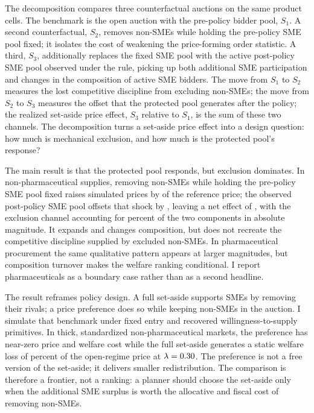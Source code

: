 The decomposition compares three counterfactual auctions on the same
product cells. The benchmark is the open auction with the pre-policy bidder
pool, $S_1$. A second counterfactual, $S_2$, removes non-SMEs while
holding the pre-policy SME pool fixed; it isolates the cost of weakening
the price-forming order statistic. A third, $S_3$, additionally replaces
the fixed SME pool with the active post-policy SME pool observed under
the rule, picking up both additional SME participation and changes in
the composition of active SME bidders. The move from $S_1$ to $S_2$
measures the lost competitive discipline from excluding non-SMEs; the
move from $S_2$ to $S_3$ measures the offset that the protected pool
generates after the policy; the realized set-aside price effect, $S_3$
relative to $S_1$, is the sum of these two channels. The decomposition
turns a set-aside price effect into a design question: how much is
mechanical exclusion, and how much is the protected pool's response?

The main result is that the protected pool responds, but exclusion dominates.
In non-pharmaceutical supplies, removing non-SMEs while holding the
pre-policy SME pool fixed raises simulated prices by \bneEffectIntensNp{} of
the reference price; the observed post-policy SME pool offsets that shock by
\bneEffectEntryNp{}, leaving a net effect of \bneEffectTotalNp{}, with the
exclusion channel accounting for \bneShareIntensNp{} percent of the two
components in absolute magnitude. It expands and changes composition,
but does not recreate the competitive discipline supplied by excluded
non-SMEs. In pharmaceutical procurement the same qualitative
pattern appears at larger magnitudes, but composition turnover makes the
welfare ranking conditional. I report pharmaceuticals as a boundary case
rather than as a second headline.

The result reframes policy design. A full set-aside supports SMEs by
removing their rivals; a price preference does so while keeping non-SMEs in
the auction. I simulate that benchmark under fixed entry and recovered
willingness-to-supply primitives. In thick, standardized non-pharmaceutical
markets, the preference has near-zero price and welfare cost while the full
set-aside generates a static welfare loss of \welfLossPctLthirtyNp{} percent
of the open-regime price at $\lambda=0.30$. The
preference is not a free version of the set-aside; it delivers smaller
redistribution. The comparison is therefore a frontier, not a ranking: a
planner should choose the set-aside only when the additional SME surplus is
worth the allocative and fiscal cost of removing non-SMEs.

